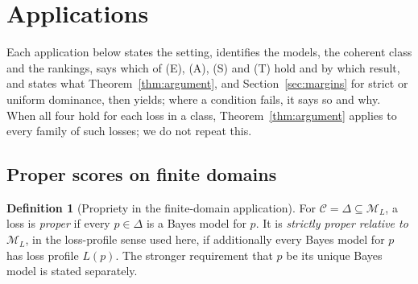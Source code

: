 \documentclass[11pt]{article}
\theoremstyle{definition}
\newtheorem{definition}[theorem]{Definition}
\theoremstyle{remark}
\newcommand{\M}{\mathcal M}
\newcommand{\C}{\mathcal C}
\begin{document}
\section{Applications}\label{sec:apps}
Each application below states the setting, identifies the models, the coherent class and the rankings, says which of (E), (A), (S) and (T) hold and by which result, and states what Theorem~\ref{thm:argument}, and Section~\ref{sec:margins} for strict or uniform dominance, then yields; where a condition fails, it says so and why. When all four hold for each loss in a class, Theorem~\ref{thm:argument} applies to every family of such losses; we do not repeat this.

\subsection{Proper scores on finite domains}\label{sec:proper}
\begin{definition}[Propriety in the finite-domain application]\label{def:propriety}
For $\C=\Delta\subseteq\M_L$, a loss is \emph{proper} if every $p\in\Delta$ is a
Bayes model for $p$. It is \emph{strictly proper relative to $\M_L$}, in the
loss-profile sense used here, if additionally every Bayes model for $p$ has loss profile
$L(p)$. The stronger requirement that $p$ be its unique Bayes model is stated separately.
\end{definition}
\end{document}
